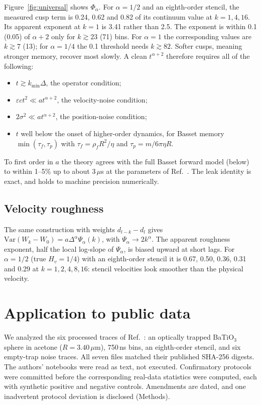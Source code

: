 \documentclass[aps,pre,10pt,twocolumn,superscriptaddress,amsmath,amssymb]{revtex4-2}
\begin{document}
Figure~\ref{fig:universal} shows $\Phi_\alpha$. For $\alpha=1/2$ and an eighth-order stencil, the measured cusp term is 0.24, 0.62 and 0.82 of its continuum value at $k=1,4,16$. Its apparent exponent at $k=1$ is 3.41 rather than 2.5. The exponent is within 0.1 (0.05) of $\alpha+2$ only for $k\gtrsim 23$ (71) bins. For $\alpha=1$ the corresponding values are $k\gtrsim 7$ (13); for $\alpha=1/4$ the 0.1 threshold needs $k\gtrsim82$. Softer cusps, meaning stronger memory, recover most slowly. A clean $t^{\alpha+2}$ therefore requires all of the following:
\begin{itemize}
\item $t\gtrsim k_{\min}\Delta$, the operator condition;
\item $\varepsilon c t^2\ll at^{\alpha+2}$, the velocity-noise condition;
\item $2\sigma^2\ll at^{\alpha+2}$, the position-noise condition;
\item $t$ well below the onset of higher-order dynamics, for Basset memory $\min(\tau_f,\tau_p)$ with $\tau_f=\rho_f R^2/\eta$ and $\tau_p=m/6\pi\eta R$.
\end{itemize}
To first order in $a$ the theory agrees with the full Basset forward model (below) to within 1--5\% up to about 3\,$\mu$s at the parameters of Ref.~\cite{Boynewicz2026}. The leak identity is exact, and holds to machine precision numerically.

\subsection{Velocity roughness}

The same construction with weights $d_{l-k}-d_l$ gives $\mathrm{Var}(W_k-W_0)=a\Delta^\alpha\Psi_\alpha(k)$, with $\Psi_\alpha\to 2k^\alpha$. The apparent roughness exponent, half the local log-slope of $\Psi_\alpha$, is biased upward at short lags. For $\alpha=1/2$ (true $H_v=1/4$) with an eighth-order stencil it is 0.67, 0.50, 0.36, 0.31 and 0.29 at $k=1,2,4,8,16$: stencil velocities look smoother than the physical velocity.

\section{Application to public data}

We analyzed the six processed traces of Ref.~\cite{Dryad2026}: an optically trapped BaTiO$_3$ sphere in acetone ($R=3.40\,\mu$m), 750\,ns bins, an eighth-order stencil, and six empty-trap noise traces. All seven files matched their published SHA-256 digests. The authors' notebooks were read as text, not executed. Confirmatory protocols were committed before the corresponding real-data statistics were computed, each with synthetic positive and negative controls. Amendments are dated, and one inadvertent protocol deviation is disclosed (Methods).
\end{document}
